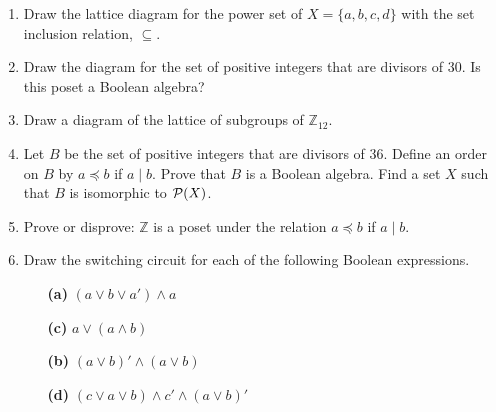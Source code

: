  
{\small
\begin{enumerate}
 
 
\bf\item\rm
Draw the lattice diagram for the power set of $X = \{ a, b, c, d \}$
with the set inclusion relation, $\subseteq$. 
 
 
\bf\item\rm
Draw the diagram for the set of positive integers that are divisors
of 30. Is this poset a Boolean algebra?
 
 
\bf\item\rm 
Draw a diagram of the lattice of subgroups of ${\mathbb Z}_{12}$.
 
 
\bf\item\rm
Let $B$ be the set of positive integers that are divisors of 36. Define
an order on $B$ by $a \preceq b$ if $a \mid b$.  Prove that $B$ is a
Boolean algebra. Find a set $X$ such that $B$ is isomorphic to ${\cal
P}(X)$.
 
 
\bf\item\rm
Prove or disprove: ${\mathbb Z}$ is a poset under the relation $a \preceq
b$ if $a \mid b$. 


\bf\item\rm
Draw the switching circuit for each of the following Boolean
expressions.
 
\vspace{3pt}        %
 
\hspace{-7pt}
\begin{minipage}[t]{4.6in}
\noindent
\begin{minipage}[t]{2.25in}
\begin{itemize}
 
 \item[{\bf (a)}]
$(a \vee b \vee a') \wedge a$
 
 \item[{\bf (c)}]
$a \vee (a \wedge b)$
 
\end{itemize}
\end{minipage} \hfill
\begin{minipage}[t]{2.25in}
\begin{itemize}
 
 \item[{\bf (b)}]
$(a \vee b)' \wedge (a \vee b)$
 
 \item[{\bf (d)}]
$(c \vee a \vee b) \wedge c' \wedge (a \vee b)'$
 

\end{itemize}
\end{minipage}
\end{minipage}
\end{enumerate}}
